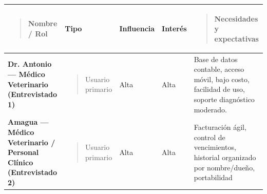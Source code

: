 \documentclass[
]{article}
\newcounter{none} %
\begin{document}
{\def\LTcaptype{none} %
\begin{longtable}[]{@{}
  >{\raggedright\arraybackslash}p{}
  >{\raggedright\arraybackslash}p{}
  >{\centering\arraybackslash}p{}
  >{\centering\arraybackslash}p{}
  >{\raggedright\arraybackslash}p{}@{}}
\toprule\noalign{}
\begin{minipage}[b]{\linewidth}\raggedright
\begin{quote}
\textbf{Nombre / Rol}
\end{quote}
\end{minipage} & \begin{minipage}[b]{\linewidth}\centering
\textbf{Tipo}
\end{minipage} & \begin{minipage}[b]{\linewidth}\centering
\textbf{Influencia}
\end{minipage} & \begin{minipage}[b]{\linewidth}\centering
\textbf{Interés}
\end{minipage} & \begin{minipage}[b]{\linewidth}\raggedright
\begin{quote}
\textbf{Necesidades y expectativas}
\end{quote}
\end{minipage} \\
\midrule\noalign{}
\endhead
\bottomrule\noalign{}
\endlastfoot
\textbf{Dr. Antonio --- Médico Veterinario (Entrevistado 1)} &
\begin{minipage}[t]{\linewidth}\raggedright
\begin{quote}
Usuario primario
\end{quote}
\end{minipage} & Alta & Alta & Base de datos contable, acceso móvil,
bajo costo, facilidad de uso, soporte diagnóstico moderado. \\
\textbf{Amagua --- Médico Veterinario / Personal Clínico (Entrevistado
2)} & \begin{minipage}[t]{\linewidth}\raggedright
\begin{quote}
Usuario primario
\end{quote}
\end{minipage} & Alta & Alta & Facturación ágil, control de
vencimientos, historial organizado por nombre/dueño, portabilidad


\end{longtable}}
\end{document}
